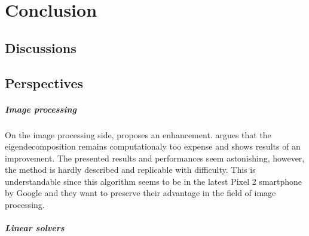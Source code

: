 \chapter{Conclusion}

\section{Discussions}
\paragraph{}

\section{Perspectives}

\paragraph{Image processing}
On the image processing side, \cite{talebi_fast_2016} proposes an enhancement.
\cite{talebi_fast_2016} argues that the eigendecomposition remains computationaly too expense and shows results of an improvement.
The presented results and performances seem astonishing, however, the method is hardly described and replicable with difficulty.
This is understandable since this algorithm seems to be in the latest Pixel 2 smartphone by Google and they want to preserve their advantage in the field of image processing.

\paragraph{Linear solvers}
